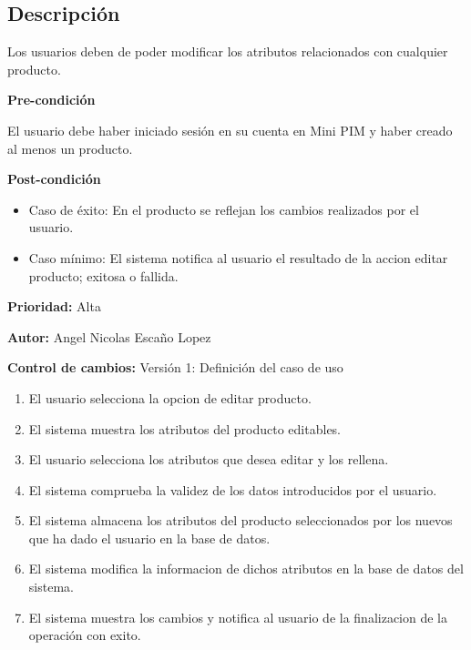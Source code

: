 {}

\subsection*{Descripción}
Los usuarios deben de poder modificar los atributos relacionados con cualquier producto.\par
\vspace{0.15cm}

\textbf{Pre-condición}\par
El usuario debe haber iniciado sesión en su cuenta en Mini PIM y haber creado al menos un producto.\par
\vspace{0.15cm}

\textbf{Post-condición}
\begin{itemize}
    \item Caso de éxito: En el producto se reflejan los cambios realizados por el usuario.
    \item Caso mínimo: El sistema notifica al usuario el resultado de la accion editar producto; exitosa o fallida.
\end{itemize}

\textbf{Prioridad: }
Alta
\vspace{0.15cm}

\textbf{Autor: }
Angel Nicolas Escaño Lopez\par
\vspace{0.15cm}

\textbf{Control de cambios: } Versión 1: Definición del caso de uso

\begin{enumerate}
    \item El usuario selecciona la opcion de editar producto.
    \item El sistema muestra los atributos del producto editables.
    \item El usuario selecciona los atributos que desea editar y los rellena.
    \item El sistema comprueba la validez de los datos introducidos por el usuario.
    \item El sistema almacena los atributos del producto seleccionados por los nuevos que ha dado el usuario en la base de datos.
    \item El sistema modifica la informacion de dichos atributos en la base de datos del sistema.
    \item El sistema muestra los cambios y notifica al usuario de la finalizacion de la operación con exito.
\end{enumerate}

